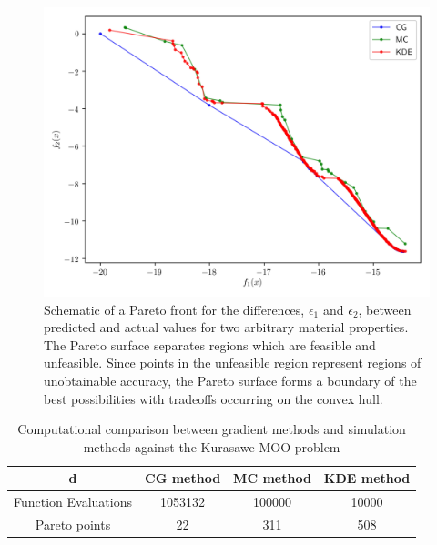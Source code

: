 \begin{figure}[h]
	\centering
  \includegraphics{chapter3/kurasawe_comparison}
  \caption{Schematic of a Pareto front for the differences, $\epsilon_1$ and $\epsilon_2$, between predicted and actual values for two arbitrary material properties.  The Pareto surface separates regions which are feasible and unfeasible.  Since points in the unfeasible region represent regions of unobtainable accuracy, the Pareto surface forms a boundary of the best possibilities with tradeoffs occurring on the convex hull. }
  \label{fig:kurasawe_comparison}
\end{figure}

\begin{table}[ht]
	\caption{Computational comparison between gradient methods and simulation methods against the Kurasawe MOO problem}
	\label{table:kurasawe}
	\centering
	 \begin{tabular}{cccc}
		 \hline
		 d & CG method & MC method & KDE method \\
		 \hline
		 Function Evaluations & 1053132 & 100000 & 10000 \\
 		 Pareto points & 22 & 311 & 508 \\
		 \hline
	 \end{tabular}
\end{table}
